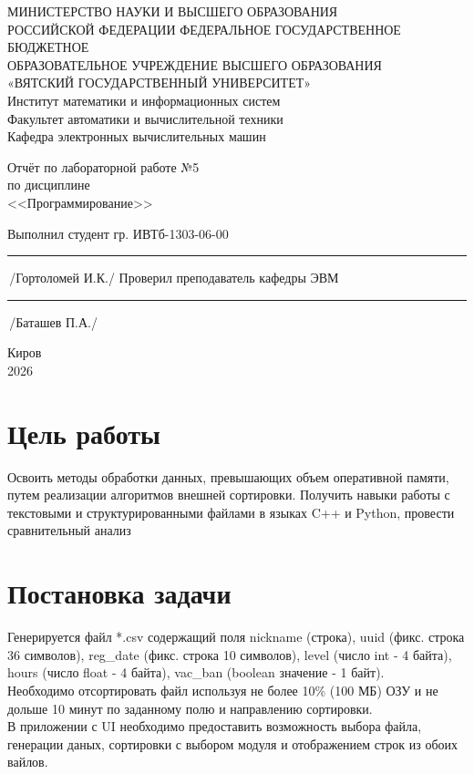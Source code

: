 \documentclass[oneside,a4paper,14pt]{extarticle} %
\begin{document}
	\newpage\thispagestyle{empty}
	\begin{center}
		МИНИСТЕРСТВО НАУКИ И ВЫСШЕГО ОБРАЗОВАНИЯ\\
			РОССИЙСКОЙ ФЕДЕРАЦИИ
			ФЕДЕРАЛЬНОЕ ГОСУДАРСТВЕННОЕ БЮДЖЕТНОЕ\\
			ОБРАЗОВАТЕЛЬНОЕ
			УЧРЕЖДЕНИЕ ВЫСШЕГО ОБРАЗОВАНИЯ\\
			«ВЯТСКИЙ ГОСУДАРСТВЕННЫЙ УНИВЕРСИТЕТ»\\
			Институт математики и информационных систем\\
			Факультет автоматики и вычислительной техники\\
			Кафедра электронных вычислительных машин
	\end{center}
	\vspace{20mm}

	\begin{center}
		Отчёт по лабораторной работе №5\\
		по дисциплине\\
		<<Программирование>>\\
	\end{center}
	\vspace{48mm}

	\noindent
	Выполнил студент гр. ИВТб-1303-06-00 \hfill \rule[-0,5mm]{30mm}{0.15mm}\,/Гортоломей И.К./
	\newline
	Проверил преподаватель кафедры ЭВМ \hfill \rule[-0,5mm]{30mm}{0.15mm}\,/Баташев П.А./

	\vfill
	\begin{center}
		Киров\\
		2026
	\end{center}

	\newpage
	\thispagestyle{empty}

	\section*{Цель работы}
	Освоить методы обработки данных, превышающих объем оперативной памяти, путем реализации алгоритмов внешней сортировки. Получить навыки работы с текстовыми и структурированными файлами в языках C++ и Python, провести сравнительный анализ
	\section*{Постановка задачи}
	\noindent
	\indent
	Генерируется файл *.csv содержащий поля nickname (строка), uuid (фикс. строка 36 символов), reg\_date (фикс. строка 10 символов),
	level (число int - 4 байта), hours (число float - 4 байта), vac\_ban (boolean значение - 1 байт). \\
	\indent
	Необходимо отсортировать файл используя не более 10\% (100 МБ) ОЗУ и не дольше 10 минут по заданному полю и направлению сортировки. \\
	\indent
	В приложении с UI необходимо предоставить возможность выбора файла, генерации даных, сортировки с выбором модуля и отображением строк из обоих вайлов.
\end{document}
